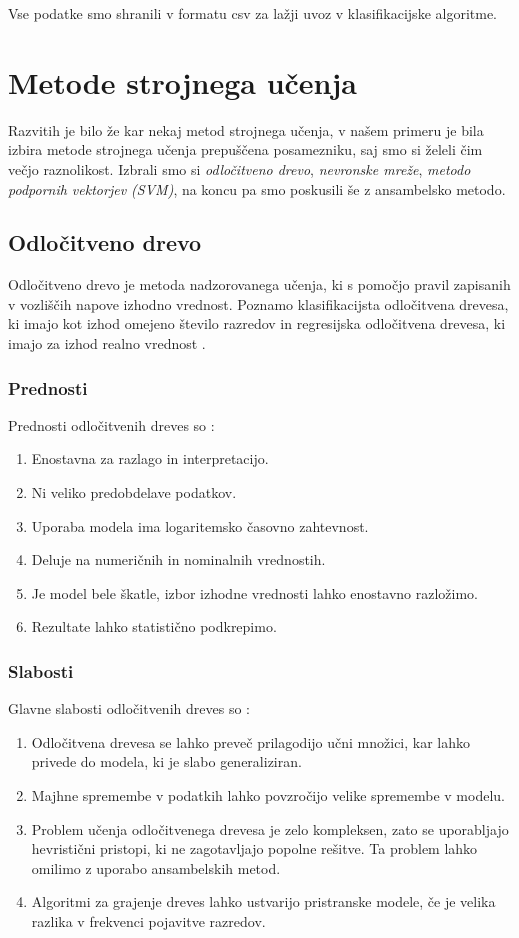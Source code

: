 \documentclass{acm_proc_article-sp}
\begin{document}
Vse podatke smo shranili v formatu csv za lažji uvoz v klasifikacijske algoritme.

\section{Metode strojnega učenja}
Razvitih je bilo že kar nekaj metod strojnega učenja, v našem primeru je bila izbira metode strojnega učenja prepuščena posamezniku, saj smo si želeli čim večjo raznolikost. Izbrali smo si \textit{odločitveno drevo}, \textit{nevronske mreže}, \textit{metodo podpornih vektorjev (SVM)}, na koncu pa smo poskusili še z ansambelsko metodo.

\subsection{Odločitveno drevo}
Odločitveno drevo je metoda nadzorovanega učenja, ki s pomočjo pravil zapisanih v vozliščih napove izhodno vrednost. Poznamo klasifikacijsta odločitvena drevesa, ki imajo kot izhod omejeno število razredov in regresijska odločitvena drevesa, ki imajo za izhod realno vrednost \cite{Wiki_tree}.
\subsubsection{Prednosti}
Prednosti odločitvenih dreves so \cite{SciTree}:
\begin{enumerate}
\item{Enostavna za razlago in interpretacijo.}
\item{Ni veliko predobdelave podatkov.}
\item{Uporaba modela ima logaritemsko časovno zahtevnost.}
\item{Deluje na numeričnih in nominalnih vrednostih.}
\item{Je model bele škatle, izbor izhodne vrednosti lahko enostavno razložimo.}
\item{Rezultate lahko statistično podkrepimo.}
\end{enumerate}
\subsubsection{Slabosti}
Glavne slabosti odločitvenih dreves so \cite{SciTree}:
\begin{enumerate}
\item{Odločitvena drevesa se lahko preveč prilagodijo učni množici, kar lahko privede do modela, ki je slabo generaliziran.}
\item{Majhne spremembe v podatkih lahko povzročijo velike spremembe v modelu.}
\item{Problem učenja odločitvenega drevesa je zelo kompleksen, zato se uporabljajo hevristični pristopi, ki ne zagotavljajo popolne rešitve. Ta problem lahko omilimo z uporabo ansambelskih metod.}
\item{Algoritmi za grajenje dreves lahko ustvarijo pristranske modele, če je velika razlika v frekvenci pojavitve razredov. }
\end{enumerate}
\end{document}
